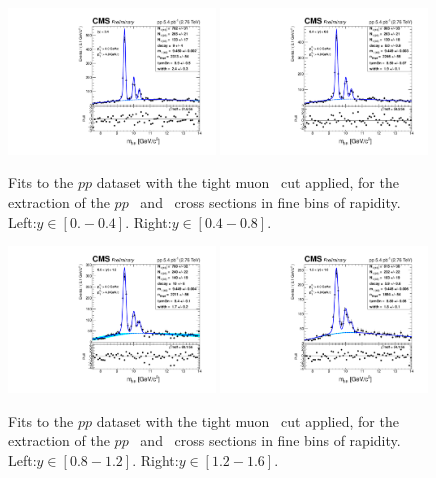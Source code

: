 \begin{figure}
  \includegraphics[width=0.49\textwidth]{Chapters/aYield/pp/pt_4_4/Rap/Rap_0_0p4/pp2p76tev_Rap_0_0p4_fsr1.pdf}  
  \includegraphics[width=0.49\textwidth]{Chapters/aYield/pp/pt_4_4/Rap/Rap_0p4_0p8/pp2p76tev_Rap_0p4_0p8_fsr1.pdf}  
  \caption{Fits to the $pp$ dataset with the tight muon \pt\ cut
    applied, for the extraction of the $pp$ \PgUb\ and \PgUc\ cross
    sections in fine bins of rapidity. Left:$y\in [0. - 0.4]$. Right:$y\in [0.4 - 0.8]$.}
  \label{fig:YieldsErfExp_2S3Sd} 
\end{figure}
\begin{figure}
  \includegraphics[width=0.49\textwidth]{Chapters/aYield/pp/pt_4_4/Rap/Rap_0p8_1p2/pp2p76tev_Rap_0p8_1p2_fsr1.pdf}  
  \includegraphics[width=0.49\textwidth]{Chapters/aYield/pp/pt_4_4/Rap/Rap_1p2_1p6/pp2p76tev_Rap_1p2_1p6_fsr1.pdf}  
  \caption{Fits to the $pp$ dataset with the tight muon \pt\ cut
    applied, for the extraction of the $pp$ \PgUb\ and \PgUc\ cross
    sections in fine bins of rapidity. Left:$y\in [0.8 - 1.2]$. Right:$y\in [1.2 - 1.6]$.}
  \label{fig:YieldsErfExp_2S3Se} 
\end{figure}

